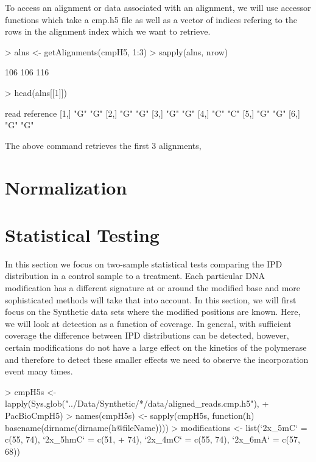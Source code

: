 \documentclass[letterpaper,12pt]{article}
\begin{document}
To access an alignment or data associated with an alignment, we will
use accessor functions which take a cmp.h5 file as well as a vector of
indices refering to the rows in the alignment index which we want to
retrieve.
\begin{Schunk}
\begin{Sinput}
> alns <- getAlignments(cmpH5, 1:3)
> sapply(alns, nrow)
\end{Sinput}
\begin{Soutput}
[1] 106 106 116
\end{Soutput}
\begin{Sinput}
> head(alns[[1]])
\end{Sinput}
\begin{Soutput}
     read reference
[1,] "G"  "G"      
[2,] "G"  "G"      
[3,] "G"  "G"      
[4,] "C"  "C"      
[5,] "G"  "G"      
[6,] "G"  "G"      
\end{Soutput}
\end{Schunk}
The above command retrieves the first 3 alignments, 

\section{Normalization}



\section{Statistical Testing}
In this section we focus on two-sample statistical tests comparing the
IPD distribution in a control sample to a treatment. Each particular
DNA modification has a different signature at or around the modified
base and more sophisticated methods will take that into account. In
this section, we will first focus on the Synthetic data sets where the
modified positions are known. Here, we will look at detection as a
function of coverage. In general, with sufficient coverage the
difference between IPD distributions can be detected, however, certain
modifications do not have a large effect on the kinetics of the
polymerase and therefore to detect these smaller effects we need to
observe the incorporation event many times.

\begin{Schunk}
\begin{Sinput}
> cmpH5s <- lapply(Sys.glob("../Data/Synthetic/*/data/aligned_reads.cmp.h5"), 
+     PacBioCmpH5)
> names(cmpH5s) <- sapply(cmpH5s, function(h) basename(dirname(dirname(h@fileName))))
> modifications <- list(`2x_5mC` = c(55, 74), `2x_5hmC` = c(51, 
+     74), `2x_4mC` = c(55, 74), `2x_6mA` = c(57, 68))
\end{Sinput}
\end{Schunk}
\end{document}
